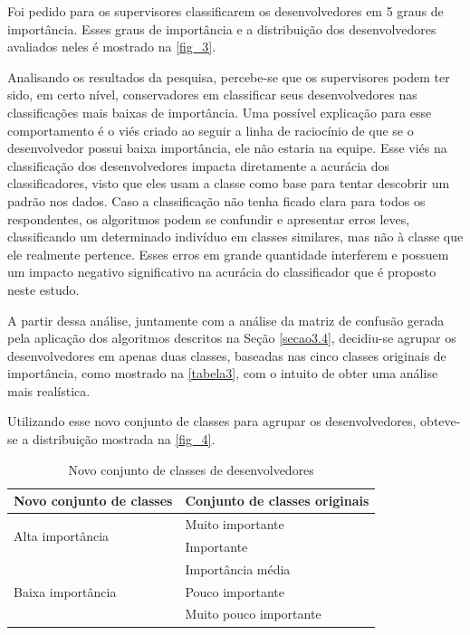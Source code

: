 Foi pedido para os supervisores classificarem os desenvolvedores em 5 graus de importância. Esses graus de importância e a distribuição dos desenvolvedores avaliados neles é mostrado na \autoref{fig_3}.

Analisando os resultados da pesquisa, percebe-se que os supervisores podem ter sido, em certo nível, conservadores em classificar seus desenvolvedores nas classificações mais baixas de importância. Uma possível explicação para esse comportamento é o viés criado ao seguir a linha de raciocínio de que se o desenvolvedor possui baixa importância, ele não estaria na equipe.
Esse viés na classificação dos desenvolvedores impacta diretamente a acurácia dos classificadores, visto que eles usam a classe como base para tentar descobrir um padrão nos dados. Caso a classificação não tenha ficado clara para todos os respondentes, os algoritmos podem se confundir e apresentar erros leves, classificando um determinado indivíduo em classes similares, mas não à classe que ele realmente pertence. Esses erros em grande quantidade interferem e possuem um impacto negativo significativo na acurácia do classificador que é proposto neste estudo.

A partir dessa análise, juntamente com a análise da matriz de confusão gerada pela aplicação dos algoritmos descritos na Seção \ref{secao3.4}, decidiu-se agrupar os desenvolvedores em apenas duas classes, baseadas nas cinco classes originais de importância, como mostrado na \autoref{tabela3}, com o intuito de obter uma análise mais realística.

Utilizando esse novo conjunto de classes para agrupar os desenvolvedores, obteve-se a distribuição mostrada na \autoref{fig_4}.


\begin{table}[h]
	\centering
	\caption{Novo conjunto de classes de desenvolvedores}
	\label{tabela3}
	\def\arraystretch{1.5}
	\begin{tabular}{|p{6cm}|p{8.5cm}|}
		\hline
		\textbf{Novo conjunto de classes}  & \textbf{Conjunto de classes originais} \\ \hline
		\multirow{2}{*}{Alta importância}  & Muito importante                       \\ \cline{2-2} 
		& Importante                             \\ \hline
		\multirow{3}{*}{Baixa importância} & Importância média                      \\ \cline{2-2} 
		& Pouco importante                       \\ \cline{2-2} 
		& Muito pouco importante                 \\ \hline
	\end{tabular}
\end{table}



